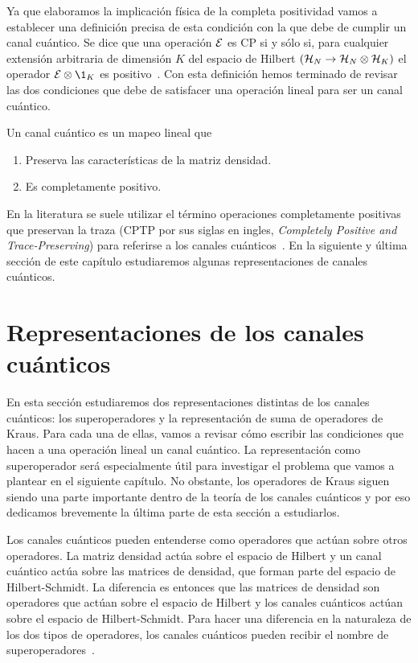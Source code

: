 Ya que elaboramos la implicación física de la completa positividad 
vamos a establecer una definición precisa de esta condición con la
que debe de cumplir un canal cuántico.
Se dice que una operación $\mathcal{E}$ es CP si 
y sólo si, para cualquier extensión arbitraria de dimensión $K$ 
del espacio de Hilbert $(\mathcal{H}_N \rightarrow \mathcal{H}_N \otimes \mathcal{H}_K)$ 
el operador $\E\otimes\1_K$ es positivo~\cite{bengtsson_zyczkowski_2017}. 
Con esta definición hemos terminado de revisar las dos condiciones que 
debe de satisfacer una operación lineal para ser un 
canal cuántico.

Un canal cuántico es un mapeo lineal que
\begin{enumerate} 
\item Preserva las características de la matriz densidad.
\item Es completamente positivo.
\end{enumerate}
En la literatura se suele utilizar el término operaciones 
completamente positivas que preservan la traza 
(CPTP por sus siglas en ingles, \textit{Completely Positive and
Trace-Preserving}) para referirse a los canales 
cuánticos~\cite{bengtsson_zyczkowski_2017}. 
En la siguiente y última sección de este capítulo estudiaremos 
algunas representaciones de canales cuánticos. 
\section{Representaciones de los canales cuánticos} %
\label{sec:qtm-channels-representation}
En esta sección estudiaremos dos representaciones distintas de 
los canales cuánticos: los superoperadores y la representación 
de suma de operadores de Kraus. Para cada una de ellas, vamos a revisar
cómo escribir las condiciones que hacen a una operación lineal un 
canal cuántico. La representación como superoperador 
será especialmente útil para investigar el problema
que vamos a plantear en el siguiente capítulo. No obstante, los 
operadores de Kraus siguen siendo una parte importante dentro 
de la teoría de los canales cuánticos y por eso dedicamos brevemente
la última parte de esta sección a estudiarlos.

Los canales cuánticos pueden entenderse como operadores 
que actúan sobre otros operadores. 
La matriz densidad actúa sobre 
el espacio de Hilbert y un canal cuántico actúa sobre las matrices de 
densidad, que forman parte del espacio de Hilbert-Schmidt. 
La diferencia es entonces que las matrices de densidad 
son operadores que actúan sobre el espacio de 
Hilbert y los canales cuánticos actúan sobre el espacio 
de Hilbert-Schmidt. Para hacer una diferencia en 
la naturaleza de los dos tipos de operadores, los canales cuánticos 
pueden recibir el nombre de superoperadores~\cite{preskill1998lecture}.

